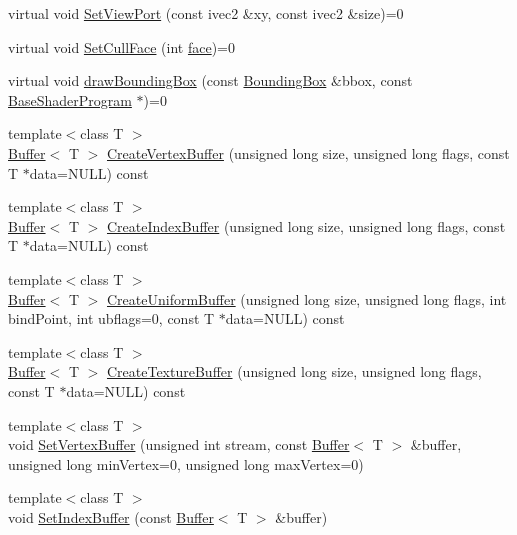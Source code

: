 \begin{DoxyCompactItemize}
\item 
virtual void \hyperlink{class_agmd_1_1_driver_ab16bec32bad282876e909ee90df11be7}{Set\+View\+Port} (const ivec2 \&xy, const ivec2 \&size)=0
\item 
virtual void \hyperlink{class_agmd_1_1_driver_a9c44dbdfe6cd21a69bd0e2557f07d95e}{Set\+Cull\+Face} (int \hyperlink{_planet_8cpp_ae1161f79bdbe47164b23549af2139d25}{face})=0
\item 
virtual void \hyperlink{class_agmd_1_1_driver_aa70ae0f0cb206e314bb35a3b99d49820}{draw\+Bounding\+Box} (const \hyperlink{class_agmd_1_1_bounding_box}{Bounding\+Box} \&bbox, const \hyperlink{class_agmd_1_1_base_shader_program}{Base\+Shader\+Program} $\ast$)=0
\item 
{\footnotesize template$<$class T $>$ }\\\hyperlink{class_agmd_1_1_buffer}{Buffer}$<$ T $>$ \hyperlink{class_agmd_1_1_driver_aeb0311aeb0121cf0ea859cc7f67213df}{Create\+Vertex\+Buffer} (unsigned long size, unsigned long flags, const T $\ast$data=N\+U\+L\+L) const 
\item 
{\footnotesize template$<$class T $>$ }\\\hyperlink{class_agmd_1_1_buffer}{Buffer}$<$ T $>$ \hyperlink{class_agmd_1_1_driver_a73a2d51147230616672aa7a1b4dd48dc}{Create\+Index\+Buffer} (unsigned long size, unsigned long flags, const T $\ast$data=N\+U\+L\+L) const 
\item 
{\footnotesize template$<$class T $>$ }\\\hyperlink{class_agmd_1_1_buffer}{Buffer}$<$ T $>$ \hyperlink{class_agmd_1_1_driver_ab05c55dc5db4066a984665715e35b17a}{Create\+Uniform\+Buffer} (unsigned long size, unsigned long flags, int bind\+Point, int ubflags=0, const T $\ast$data=N\+U\+L\+L) const 
\item 
{\footnotesize template$<$class T $>$ }\\\hyperlink{class_agmd_1_1_buffer}{Buffer}$<$ T $>$ \hyperlink{class_agmd_1_1_driver_a30c95b577c73fee812ceb1714c542e1b}{Create\+Texture\+Buffer} (unsigned long size, unsigned long flags, const T $\ast$data=N\+U\+L\+L) const 
\item 
{\footnotesize template$<$class T $>$ }\\void \hyperlink{class_agmd_1_1_driver_a8250e4086394f717b67cb38059a8d3fe}{Set\+Vertex\+Buffer} (unsigned int stream, const \hyperlink{class_agmd_1_1_buffer}{Buffer}$<$ T $>$ \&buffer, unsigned long min\+Vertex=0, unsigned long max\+Vertex=0)
\item 
{\footnotesize template$<$class T $>$ }\\void \hyperlink{class_agmd_1_1_driver_a5dccb83b805c97bc4b50c92999055737}{Set\+Index\+Buffer} (const \hyperlink{class_agmd_1_1_buffer}{Buffer}$<$ T $>$ \&buffer)

\end{DoxyCompactItemize}
